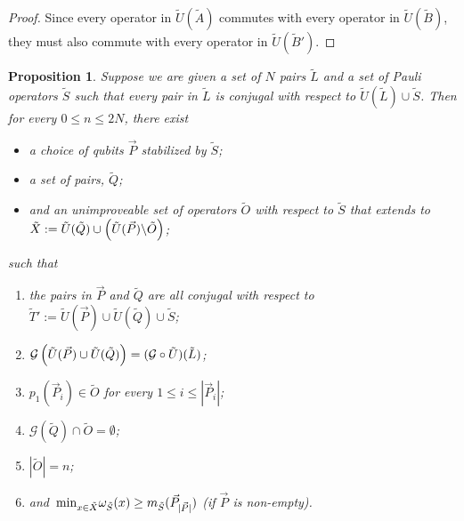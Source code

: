 \documentclass[twocolumn,showpacs,preprintnumbers,amsmath,amssymb,nofootinbib,pra,floatfix]{revtex4-1}
\newtheorem{proposition}{Proposition}
\newcommand{\lst}{\vec}
\newcommand{\set}{\tilde}
\newcommand{\genfun}{\mathcal{G}}
\begin{document}
\begin{proof}
Since every operator in $\set U(\set A)$ commutes with every operator in $\set U(\set B)$, they must also commute with every operator in $\set U(\set B')$.
\end{proof}
\begin{proposition}
Suppose we are given a set of $N$ pairs $\set L$ and a set of Pauli operators $\set S$ such that every pair in $\set L$ is conjugal with respect to $\set U(\set L)\cup\set S$.  Then for every $0\le n \le 2N$, there exist
\begin{itemize}
\item a choice of qubits $\lst P$ stabilized by $\set S$;
\item a set of pairs, $\set Q$;
\item and an unimproveable set of operators $\set O$ with respect to $\set S$ that extends to $\set X:=\set U(\set Q) \cup \paren{\set U(\lst P) \backslash \set O}$;
\end{itemize}
such that
\begin{enumerate}
\item \label{pairs are all conjugal to T} the pairs in $\lst P$ and $\set Q$ are all conjugal with respect to $\set T':=\set U(\lst P)\cup \set U(\set Q)\cup \set S$;
\item \label{P and Q generate the same set as L} $\genfun\paren{\set U(\lst P)\cup \set U(\set Q)}=(\genfun\circ\set U)(\set L)$;
\item \label{first members are all in O} $p_1(\lst P_i)\in \set O$ for every $1 \le i \le |\lst P_i|$;
\item \label{Q does not intersect with O} $\genfun(\set Q) \cap \set O = \emptyset$;
\item \label{size of O matches arbitrarily chosen integer} $|\set O|=n$;
\item \label{operators in X are no worse than the best qubit in P} and $\min_{x\in\set X}\om_{\set S}(x)\ge m_{\set S}(\lst P_{|\lst P|})$ (if $\lst P$ is non-empty).
\end{enumerate}
\end{proposition}
\end{document}
